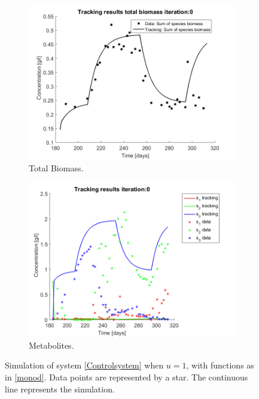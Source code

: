 \documentclass[processes,article,submit,moreauthors,pdftex]{Definitions/mdpi}
\begin{document}
\begin{figure}[h]
	\centering	
	\begin{subfigure}{0.45 \textwidth}
		\includegraphics[width=\textwidth]{Application//191218_Reactor_A_Biomass_iter_0}
		\caption{Total Biomass.}
		\label{biomass_no_control}
	\end{subfigure}
	\begin{subfigure}{0.45 \textwidth}
		\includegraphics[width= \textwidth]{Application//191218_Reactor_A_metabolites_Iter_0}
		\caption{Metabolites.}
		\label{u=1_metabolites}
	\end{subfigure}
	\caption{Simulation of system \eqref{Controlsystem} when $u=1$, with functions as in \eqref{monod}. Data points are represented by a star. The continuous line represents the simulation.}
	\label{u=1 simulation.}
\end{figure}
\end{document}
